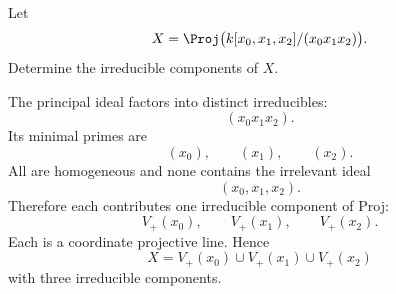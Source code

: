 \begin{problem}\label{prob:vi37-10}
Let
\[
X=\Proj\bigl(k[x_0,x_1,x_2]/(x_0x_1x_2)\bigr).
\]
Determine the irreducible components of \(X\).
\end{problem}

\ifdefined\FullProblemDossiers
\begin{solution}
The principal ideal factors into distinct irreducibles:
\[
(x_0x_1x_2).
\]
Its minimal primes are
\[
(x_0),\qquad(x_1),\qquad(x_2).
\]
All are homogeneous and none contains the irrelevant ideal
\[
(x_0,x_1,x_2).
\]
Therefore each contributes one irreducible component of Proj:
\[
V_+(x_0),\qquad
V_+(x_1),\qquad
V_+(x_2).
\]
Each is a coordinate projective line. Hence
\[
\boxed{
X
=
V_+(x_0)\cup V_+(x_1)\cup V_+(x_2)
}
\]
with three irreducible components.
\end{solution}
\fi
